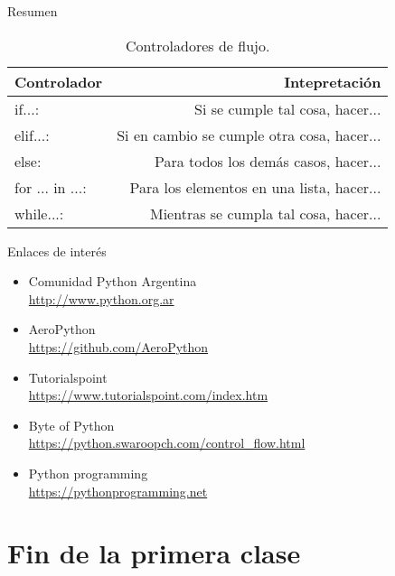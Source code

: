 \documentclass[10pt]{beamer}
\begin{document}
\begin{frame}{Resumen}
	\begin{table}
		\caption{Controladores de flujo.}
		\begin{tabular}{lr}
			\toprule
			Controlador&Intepretación\\
			\midrule
			if...:&Si se cumple tal cosa, hacer...\\
			elif...:&Si en cambio se cumple otra cosa, hacer...\\ 
			else:&Para todos los demás casos, hacer...\\
			for ... in ...:&Para los elementos en una lista, hacer...\\
			while...:&Mientras se cumpla tal cosa, hacer...\\ 
			\bottomrule
		\end{tabular}
	\end{table}
\end{frame}
\appendix

\begin{frame}{Enlaces de interés}
	\begin{itemize}
		\item \alert{Comunidad Python Argentina}\\ \url{http://www.python.org.ar}
		\item \alert{AeroPython}\\ \url{https://github.com/AeroPython}
		\item \alert{Tutorialspoint}\\ \url{https://www.tutorialspoint.com/index.htm}
		\item \alert{Byte of Python}\\ \url{https://python.swaroopch.com/control_flow.html}
		\item \alert{Python programming}\\ \url{https://pythonprogramming.net}
	\end{itemize}
\end{frame}
\section{Fin de la primera clase}
\end{document}
